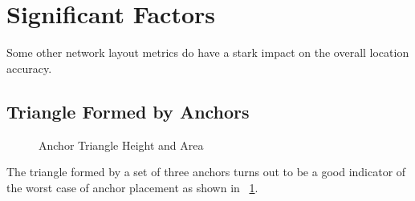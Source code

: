 \section{Significant Factors}

Some other network layout metrics do have a stark impact on the overall location accuracy.

\subsection{Triangle Formed by Anchors}

\begin{figure}
  \centering
    \caption{Anchor Triangle Height and Area}
    \label{fig:TriangleAreaHeight1}
\end{figure}

The triangle formed by a set of three anchors turns out to be a good indicator of the worst case of anchor placement as shown in ~\ref{fig:TriangleAreaHeight1}.
